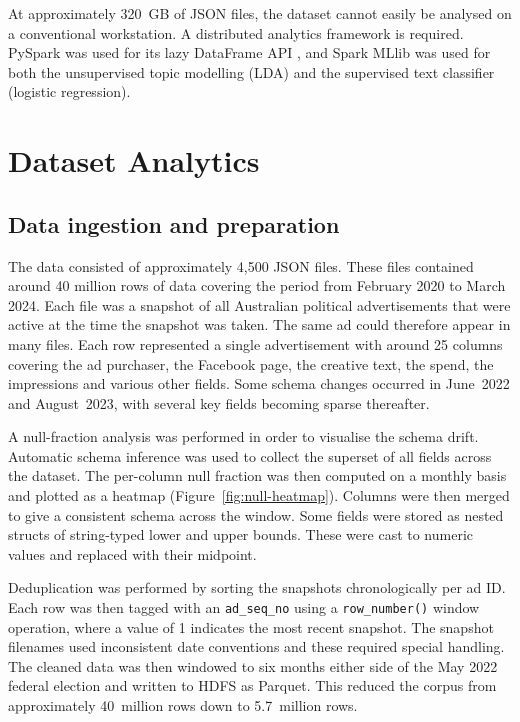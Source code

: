 \documentclass[11pt,a4paper]{article}
\begin{document}
At approximately 320~GB of JSON files, the dataset cannot easily be analysed on a
conventional workstation. A distributed analytics framework is required. PySpark \citep{zaharia2016apache} was used for its lazy DataFrame API \citep{armbrust2015sparksql}, and Spark MLlib \citep{meng2016mllib} was used for both the unsupervised topic modelling (LDA) and the supervised text classifier (logistic regression).


\section{Dataset Analytics}


\subsection{Data ingestion and preparation}

The data consisted of approximately 4{,}500 JSON files. These files contained around 40 million rows of data covering the period from February 2020 to March 2024. Each file was a snapshot of all Australian political advertisements that were active at the time the snapshot was taken. The same ad could therefore appear in many files. Each row represented a single advertisement with around 25 columns covering the ad purchaser, the Facebook page, the creative text, the spend, the impressions and various other fields. Some schema changes occurred in June~2022 and August~2023, with several key fields becoming sparse thereafter.

A null-fraction analysis was performed in order to visualise the schema drift. Automatic schema inference was used to collect the superset of all fields across the dataset. The per-column null fraction was then computed on a monthly basis and plotted as a heatmap (Figure~\ref{fig:null-heatmap}). Columns were then merged to give a consistent schema across the window. Some fields were stored as nested structs of string-typed lower and upper bounds. These were cast to numeric values and replaced with their midpoint.

Deduplication was performed by sorting the snapshots chronologically per ad ID. Each row was then tagged with an \texttt{ad\_seq\_no} using a \texttt{row\_number()} window operation, where a value of 1 indicates the most recent snapshot. The snapshot filenames used inconsistent date conventions and these required special handling. The cleaned data was then windowed to six months either side of the May 2022 federal election and written to HDFS as Parquet. This reduced the corpus from approximately 40~million rows down to 5.7~million rows.
\end{document}
